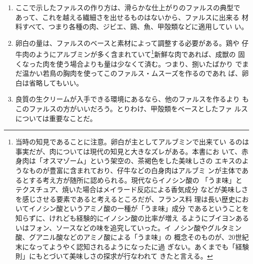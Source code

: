 \begin{recette}
\begin{enumerate}
\def\labelenumi{\arabic{enumi}.}
\setcounter{enumi}{1}
\item
  ここで示したファルスの作り方は、滑らかな仕上がりのファルスの典型で
  あって、これを越える繊細さを出せるものはないから、ファルスに出来る
  材料すべて、つまり各種の肉、ジビエ、鶏、魚、甲殻類などに適用してい
  い。
\item
  卵白の量は、ファルスのベースと素材によって調整する必要がある。鶏や
  仔牛肉のようにアルブミンが多く含まれていて\footnote{当時の知見であることに注意。卵白が主としてアルブミンで出来てい
    るのは事実だが、肉については現代の知見と大きなズレがある。本書にお
    いて、赤身肉は「オスマゾーム」という架空の、茶褐色をした美味しさの
    エキスのようなものが豊富に含まれており、仔牛などの白身肉はアルブミ
    ンが主体であるとする考え方が随所に認められる。現代ならイノシン酸の
    「うま味」とテクスチュア、焼いた場合はメイラード反応による香気成分
    などが美味しさを感じさせる要素であると考えるところだが、フランス料
    理は長い歴史においてイノシン酸というアミノ酸の一種が「うま味」成分
    であるということを知らずに、けれども経験的にイノシン酸の比率が増え
    るようにブイヨンあるいはフォン、ソースなどの味を追究していった。イ
    ノシン酸やグルタミン酸、グアニル酸などのアミノ酸による「うま味」の
    概念そのものが、20世紀末になってようやく認知されるようになったに過
    ぎない。あくまでも「経験則」にもとづいて美味しさの探求が行なわれて
    きたと言える。}新鮮な肉であれば、成獣の
  固くなった肉を使う場合よりも量は少なくて済む。つまり、捌いたばかり
  でまだ温かい若鳥の胸肉を使ってこのファルス・ムスーズを作るのであれ
  ば、卵白は省略してもいい。
\item
  良質の生クリームが入手できる環境にあるなら、他のファルスを作るより
  もこのファルスの方がいいだろう。とりわけ、甲殻類をベースとしたファ
  ルスについては重要なことだ。
\end{enumerate}
\end{recette}
